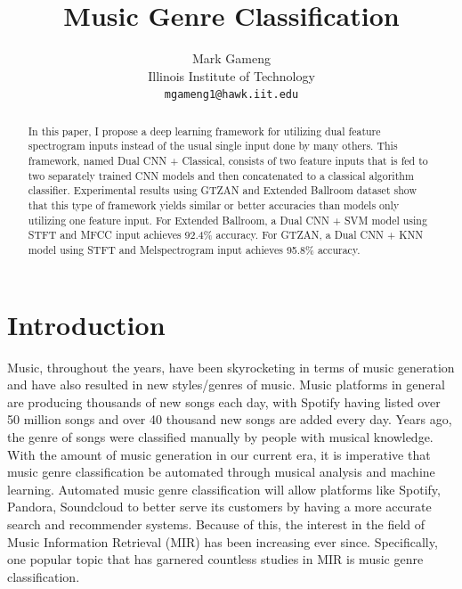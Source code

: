 \documentclass[10pt,twocolumn,letterpaper]{article}
\begin{document}
	
	\title{Music Genre Classification}
	
	\author{Mark Gameng\\
		Illinois Institute of Technology\\
		{\tt\small mgameng1@hawk.iit.edu}
	}
	
	\maketitle
	
	\begin{abstract} %
		In this paper, I propose a deep learning framework for utilizing dual feature spectrogram inputs instead of the usual single input done by many others. This framework, named Dual CNN + Classical, consists of two feature inputs that is fed to two separately trained CNN models and then concatenated to a classical algorithm classifier. Experimental results using GTZAN and Extended Ballroom dataset show that this type of framework yields similar or better accuracies than models only utilizing one feature input. For Extended Ballroom, a Dual CNN + SVM model using STFT and MFCC input achieves 92.4\% accuracy. For GTZAN, a Dual CNN + KNN model using STFT and Melspectrogram input achieves 95.8\% accuracy. 
	\end{abstract}

	\section{Introduction} %
	
	Music, throughout the years, have been skyrocketing in terms of music generation and have also resulted in new styles/genres of music. Music platforms in general are producing thousands of new songs each day, with Spotify having listed over 50 million songs and over 40 thousand new songs are added every day. Years ago, the genre of songs were classified manually by people with musical knowledge. With the amount of music generation in our current era, it is imperative that music genre classification be automated through musical analysis and machine learning. Automated music genre classification will allow platforms like Spotify, Pandora, Soundcloud to better serve its customers by having a more accurate search and recommender systems. Because of this, the interest in the field of Music Information Retrieval (MIR) has been increasing ever since. Specifically, one popular topic that has garnered countless studies in MIR is music genre classification.
	
\end{document}
